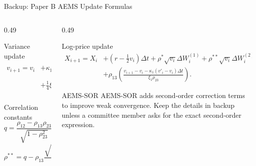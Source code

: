 \begin{frame}{Backup: Paper B AEMS Update Formulas}
  \begin{columns}[T,onlytextwidth]
    \begin{column}{0.49\textwidth}
      \begin{block}{Variance update}
        {\tiny
        \[
        \begin{aligned}
        v_{i+1}=v_i&+\kappa_1(v'_i-v_i)\Delta t
        +\xi_1\sqrt{v_i}\Delta W_i^{(2)}\\
        &+\frac14\xi_1^2\left((\Delta W_i^{(2)})^2-\Delta t\right).
        \end{aligned}
        \]}
      \end{block}
      \begin{block}{Correlation constants}
        {\tiny
        \[
        q=\frac{\rho_{12}-\rho_{13}\rho_{23}}{\sqrt{1-\rho_{23}^2}},\quad
        \rho^*=\sqrt{1-\rho_{13}^2-q^2},
        \]
        \[
        \rho^{**}=q-\rho_{13}\frac{\sqrt{1-\rho_{23}^2}}{\rho_{23}}.
        \]}
      \end{block}
    \end{column}
    \begin{column}{0.49\textwidth}
      \begin{block}{Log-price update}
        {\tiny
        \[
        \begin{aligned}
        X_{i+1}=X_i&+\left(r-\frac12v_i\right)\Delta t
        +\rho^*\sqrt{v_i}\Delta W_i^{(1)}
        +\rho^{**}\sqrt{v_i}\Delta W_i^{(2)}\\
        &+\rho_{13}\left(\frac{v_{i+1}-v_i-\kappa_1(v'_i-v_i)\Delta t}{\xi_1\rho_{23}}\right).
        \end{aligned}
        \]}
      \end{block}
      \begin{block}{AEMS-SOR}
        AEMS-SOR adds second-order correction terms to improve weak convergence. Keep the details in backup unless a committee member asks for the exact second-order expression.
      \end{block}
    \end{column}
  \end{columns}
\end{frame}

